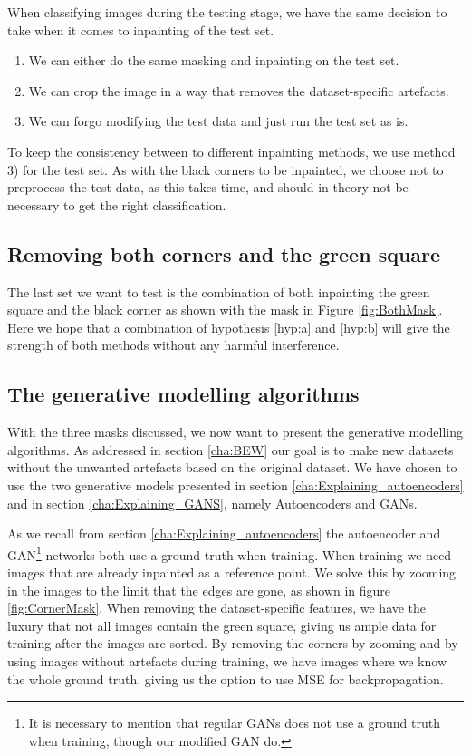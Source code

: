 When classifying images during the testing stage, we have the same decision to take when it comes to inpainting of the test set.
\begin{enumerate}
\item We can either do the same masking and inpainting on the test set. 
\item We can crop the image in a way that removes the dataset-specific artefacts.
\item We can forgo modifying the test data and just run the test set as is. 
\end{enumerate}

To keep the consistency between to different inpainting methods, we use method 3) for the test set.
As with the black corners to be inpainted, we choose not to preprocess the test data, as this takes time, and should in theory not be necessary to get the right classification.
 

\subsection{Removing both corners and the green square}
The last set we want to test is the combination of both inpainting the green square and the black corner as shown with the mask in Figure \ref{fig:BothMask}. 
Here we hope that a combination of hypothesis \ref{hyp:a} and \ref{hyp:b} will give the strength of both methods without any harmful interference. 


\subsection{The generative modelling algorithms}
With the three masks discussed, we now want to present the generative modelling algorithms. As addressed in section \ref{cha:BEW} our goal is to make new datasets without the unwanted artefacts based on the original dataset. 
We have chosen to use the two generative models presented in section \ref{cha:Explaining_autoencoders} and in section \ref{cha:Explaining_GANS}, namely Autoencoders and GANs.


As we recall from section \ref{cha:Explaining_autoencoders} the autoencoder and GAN\footnote{It is necessary to mention that regular GANs does not use a ground truth when training, though our modified GAN do.} networks both use a ground truth when training.
When training we need images that are already inpainted as a reference point. We solve this by zooming in the images to the limit that the edges are gone, as shown in figure \ref{fig:CornerMask}. When removing the dataset-specific features, we have the luxury that not all images contain the green square, giving us ample data for training after the images are sorted.
By removing the corners by zooming and by using images without artefacts during training, we have images where we know the whole ground truth, giving us the option to use MSE for backpropagation.


